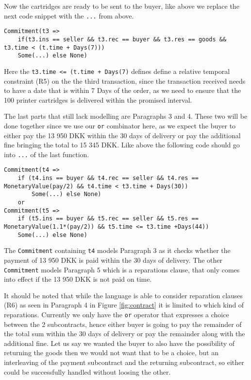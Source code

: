 \documentclass{ituthesis}
\begin{document}
Now the cartridges are ready to be sent to the buyer, like above we replace the next code snippet with the \texttt{...} from above.
\begin{lstlisting}
Commitment(t3 =>
    if(t3.ins == seller && t3.rec == buyer && t3.res == goods && t3.time < (t.time + Days(7)))
	Some(...) else None)
\end{lstlisting}
Here the \texttt{t3.time <= (t.time + Days(7)} defines define a relative temporal constraint (R5) on the the third transaction, since the transaction received needs to have a date that is within 7 Days of the order, as we need to ensure that the 100 printer cartridges is delivered within the promised interval.

The last parts that still lack modelling are Paragraphs 3 and 4. These two will be done together since we use our \texttt{or} combinator here, as we expect the buyer to either pay the 13 950 DKK within the 30 days of delivery or pay the additional fine bringing the total to 15 345 DKK. Like above the following code should go into \texttt{...} of the last function.
\begin{lstlisting}
Commitment(t4 =>
    if (t4.ins == buyer && t4.rec == seller && t4.res == MonetaryValue(pay/2) && t4.time < t3.time + Days(30))
		Some(...) else None)
    or
Commitment(t5 => 
    if (t5.ins == buyer && t5.rec == seller && t5.res == MonetaryValue(1.1*(pay/2)) && t5.time <= t3.time +Days(44))
    Some(...) else None)
\end{lstlisting}
%
The \texttt{Commitment} containing \texttt{t4} models Paragraph 3 as it checks whether the payment of 13 950 DKK is paid within the 30 days of delivery. The other \texttt{Commitment} models Paragraph 5 which is a reparations clause, that only comes into effect if the 13 950 DKK is not paid on time.

It should be noted that while the language is able to consider reparation clauses (R6) as seen in Paragraph 4 in Figure \ref{fig:contract} it is limited to which kind of reparations. Currently we only have the \texttt{or} operator that expresses a choice between the 2 subcontracts, hence either buyer is going to pay the remainder of the total sum within the 30 days of delivery or pay the remainder along with the additional fine. Let us say we wanted the buyer to also have the possibility of returning the goods then we would not want that to be a choice, but an interleaving of the payment subcontract and the returning subcontract, so either could be successfully handled without loosing the other.
\end{document}

